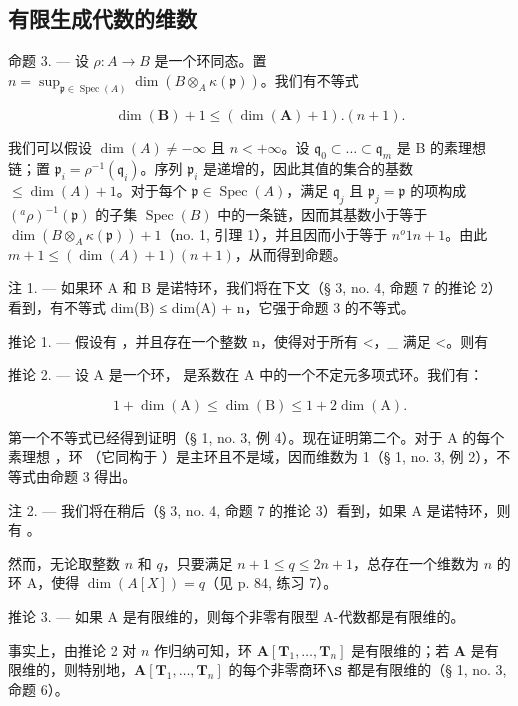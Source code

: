 \subsection{有限生成代数的维数}

命题 3. --- 设 \(\rho: A \to B\) 是一个环同态。置 \(n = \sup_{\mathfrak{p} \in \operatorname{Spec}(A)} \dim(B \otimes_A \kappa(\mathfrak{p}))\)。我们有不等式

\[
\dim (\mathbf {B}) + 1 \leqslant (\dim (\mathbf {A}) + 1). (n + 1).
\]

我们可以假设 \(\dim(A) \neq -\infty\) 且 \(n < +\infty\)。设 \(\mathfrak{q}_0 \subset \ldots \subset \mathfrak{q}_m\) 是 B 的素理想链；置 \(\mathfrak{p}_i = \rho^{-1}(\mathfrak{q}_i)\)。序列 \(\mathfrak{p}_i\) 是递增的，因此其值的集合的基数 \(\leqslant \dim(A) + 1\)。对于每个 \(\mathfrak{p} \in \operatorname{Spec}(A)\)，满足 \(\mathfrak{q}_j\) 且 \(\mathfrak{p}_j = \mathfrak{p}\) 的项构成 \(({}^{a}\rho)^{-1}(\mathfrak{p})\) 的子集 \(\operatorname{Spec}(B)\) 中的一条链，因而其基数小于等于 \(\dim(B \otimes_A \kappa(\mathfrak{p})) + 1\)（no. 1, 引理 1），并且因而小于等于 \(n^o 1\)\(n + 1\)。由此 \(m + 1 \leqslant (\dim(A) + 1)(n + 1)\)，从而得到命题。

注 1. --- 如果环 A 和 B 是诺特环，我们将在下文（§ 3, no. 4, 命题 7 的推论 2）看到，有不等式 dim(B) ≤ dim(A) + n，它强于命题 3 的不等式。

推论 1. --- 假设有  ，并且存在一个整数 n，使得对于所有 \textless{}，\_ 满足 \textless{}。则有

推论 2. --- 设 A 是一个环，{}{} 是系数在 A 中的一个不定元多项式环。我们有：

\[
1 + \dim (\mathrm{A}) \leqslant \dim (\mathrm{B}) \leqslant 1 + 2 \dim (\mathrm{A}).
\]

第一个不等式已经得到证明（§ 1, no. 3, 例 4）。现在证明第二个。对于 A 的每个素理想  ，环 {（它同构于 }{}）是主环且不是域，因而维数为 1（§ 1, no. 3, 例 2），不等式由命题 3 得出。

注 2. --- 我们将在稍后（§ 3, no. 4, 命题 7 的推论 3）看到，如果 A 是诺特环，则有 {}{}。

然而，无论取整数 \(n\) 和 \(q\)，只要满足 \(n + 1 \leqslant q \leqslant 2n + 1\)，总存在一个维数为 \(n\) 的环 A，使得 \(\dim(A[X]) = q\)（见 p. 84, 练习 7）。

推论 3. --- 如果 A 是有限维的，则每个非零有限型 A-代数都是有限维的。

事实上，由推论 2 对 \(n\) 作归纳可知，环 \(\mathbf{A}[\mathbf{T}_{1}, \ldots, \mathbf{T}_{n}]\) 是有限维的；若 \(\mathbf{A}\) 是有限维的，则特别地，\(\mathbf{A}[\mathbf{T}_{1}, \ldots, \mathbf{T}_{n}]\) 的每个非零商环\(\S\) 都是有限维的（§ 1, no. 3, 命题 6）。


